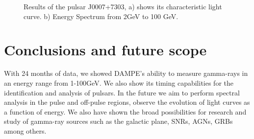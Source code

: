 \documentclass{PoS}
\begin{document}
\begin{figure}
\centering
{}
\caption{Results of the pulsar J0007+7303, a)  shows its characteristic  light curve. b) Energy Spectrum from 2GeV to 100 GeV.}
\label{j0007}
\end{figure}




\section{Conclusions and future scope}
With 24 months of  data, we showed DAMPE's ability to measure gamma-rays in an energy range from 1-100GeV.
We also show its timing capabilities for the identification and analysis of pulsars.
In the future we aim to perform spectral analysis in the pulse and off-pulse regions, observe the evolution of light curves  as a function of energy.
We also have shown the broad possibilities for research and study of gamma-ray sources such as the galactic plane, SNRs, AGNs, GRBs among others.
\end{document}
